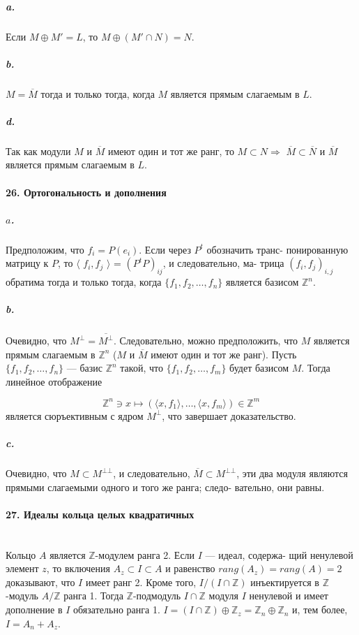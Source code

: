 {\subparagraph{a.} Если $M \oplus M' = L$, то $M \oplus (M' \cap N) = N$.

\subparagraph{b.} $M = \overline{M}$ тогда и только тогда, когда $M$ является прямым слагаемым в $L$.




\subparagraph{d.} Так как модули $M$ и $\overline{M}$ имеют один и тот же ранг, то $M \subset N \Rightarrow$
$\overline{M} \subset \overline{N}$ и $\overline{M}$ является прямым слагаемым в $L$.

\paragraph{26. Ортогональность и дополнения}

\subparagraph{$a$.} Предположим, что $f_{i} = P(e_{i})$. Если через $P^t$ обозначить транс-
понированную матрицу к $P$, то $\langle$ $f_{i},f_{j}$ $\rangle$ = $(P^{t}P)_{ij}$, и следовательно, ма-
трица $(f_{i},f_{j})_{i,j}$ обратима тогда и только тогда, когда $\{f_{1},f_{2},\ldots,f_{n}\}$
является базисом $\mathbb {Z}^{n}$.

\subparagraph{b.} Очевидно, что $M^{\bot} = \overline{M^{\bot}}$. Следовательно, можно предположить,
что $M$ является прямым слагаемым в $\mathbb {Z}^{n}$ ($M$ и $\overline{M}$ имеют один и тот
же ранг). Пусть $\{f_{1},f_{2},\ldots,f_{n}\}$ --- базис $\mathbb {Z}^{n}$ такой, что $\{f_{1},f_{2},\ldots,f_{m}\}$
будет базисом $M$. Тогда линейное отображение

\begin{equation*}
\mathbb {Z}^{n} \ni x \mapsto (\langle x,f_{1} \rangle,\ldots,\langle x,f_{m} \rangle) \in \mathbb {Z}^{m}
\end{equation*}
является сюръективным с ядром $M^{\bot}$, что завершает доказательство.
\subparagraph{c.} Очевидно, что $M \subset M^{\bot\bot}$, и следовательно, $\overline{M} \subset M^{\bot\bot}$, эти два
модуля являются прямыми слагаемыми одного и того же ранга; следо-
вательно, они равны.

\paragraph{27. Идеалы кольца целых квадратичных} \mbox{}\\

Кольцо $A$ является $\mathbb {Z}$-модулем ранга 2. Если $I$ --- идеал, содержа-
щий ненулевой элемент $z$, то включения $A_{z} \subset I \subset A$ и равенство
$rang (A_{z}) = rang (A) = 2$ доказывают, что $I$ имеет ранг 2. Кроме того,
$I/(I\cap\mathbb {Z})$ инъектируется в $\mathbb {Z}$-модуль $A/\mathbb {Z}$ ранга 1. Тогда $\mathbb {Z}$-подмодуль
$I\cap\mathbb {Z}$ модуля $I$ ненулевой и имеет дополнение в $I$ обязательно ранга 1.
$I = (I\cap\mathbb {Z}) \oplus \mathbb {Z}_{z} = \mathbb {Z}_{n} \oplus \mathbb {Z}_{n}$ и, тем более, $I = A_{n} + A_{z}$.

}

